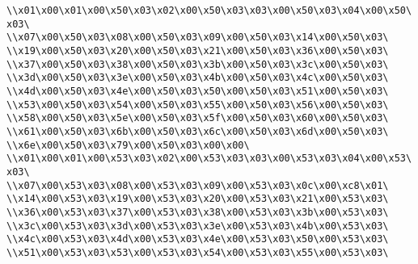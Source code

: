 \verb|\\x01\x00\x01\x00\x50\x03\x02\x00\x50\x03\x03\x00\x50\x03\x04\x00\x50\x03\|\newline
\verb|\\x07\x00\x50\x03\x08\x00\x50\x03\x09\x00\x50\x03\x14\x00\x50\x03\|\newline
\verb|\\x19\x00\x50\x03\x20\x00\x50\x03\x21\x00\x50\x03\x36\x00\x50\x03\|\newline
\verb|\\x37\x00\x50\x03\x38\x00\x50\x03\x3b\x00\x50\x03\x3c\x00\x50\x03\|\newline
\verb|\\x3d\x00\x50\x03\x3e\x00\x50\x03\x4b\x00\x50\x03\x4c\x00\x50\x03\|\newline
\verb|\\x4d\x00\x50\x03\x4e\x00\x50\x03\x50\x00\x50\x03\x51\x00\x50\x03\|\newline
\verb|\\x53\x00\x50\x03\x54\x00\x50\x03\x55\x00\x50\x03\x56\x00\x50\x03\|\newline
\verb|\\x58\x00\x50\x03\x5e\x00\x50\x03\x5f\x00\x50\x03\x60\x00\x50\x03\|\newline
\verb|\\x61\x00\x50\x03\x6b\x00\x50\x03\x6c\x00\x50\x03\x6d\x00\x50\x03\|\newline
\verb|\\x6e\x00\x50\x03\x79\x00\x50\x03\x00\x00\|\newline
\verb|\\x01\x00\x01\x00\x53\x03\x02\x00\x53\x03\x03\x00\x53\x03\x04\x00\x53\x03\|\newline
\verb|\\x07\x00\x53\x03\x08\x00\x53\x03\x09\x00\x53\x03\x0c\x00\xc8\x01\|\newline
\verb|\\x14\x00\x53\x03\x19\x00\x53\x03\x20\x00\x53\x03\x21\x00\x53\x03\|\newline
\verb|\\x36\x00\x53\x03\x37\x00\x53\x03\x38\x00\x53\x03\x3b\x00\x53\x03\|\newline
\verb|\\x3c\x00\x53\x03\x3d\x00\x53\x03\x3e\x00\x53\x03\x4b\x00\x53\x03\|\newline
\verb|\\x4c\x00\x53\x03\x4d\x00\x53\x03\x4e\x00\x53\x03\x50\x00\x53\x03\|\newline
\verb|\\x51\x00\x53\x03\x53\x00\x53\x03\x54\x00\x53\x03\x55\x00\x53\x03\|\newline
